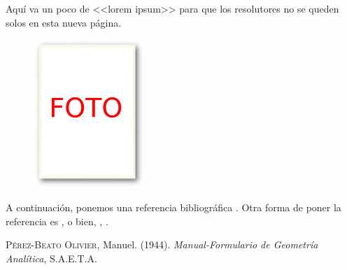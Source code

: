 \documentclass[
	fecha={5 de agosto de 2025},
	palabrasclave={RetoSecundaria, ago2025, álgebra, dif1},
	codigo=minted
]{RetoMatematico}
\begin{document}
Aquí va un poco de <<lorem ipsum>> para que los resolutores no se queden solos en esta nueva página.

\lipsum[1]

\begin{figure}
	\vspace{-5mm}
	\centering
	\includegraphics[width=42mm]{imagenes/autor}
	\caption{}
\end{figure}
\lipsum[2-3]

A continuación, ponemos una referencia bibliográfica \cite[véase][p. 25]{beato1944}. Otra forma de poner la referencia es \citet[p. 25]{beato1944}, o bien, \citeauthor{beato1944}, \citeyear[p. 25]{beato1944}.




\begin{thebibliography}{A}
	
	 \textsc{Pérez-Beato Olivier}, Manuel. (1944). \textit{Manual-Formulario de Geometría Analítica}, S.A.E.T.A.
	
\end{thebibliography}
\end{document}
